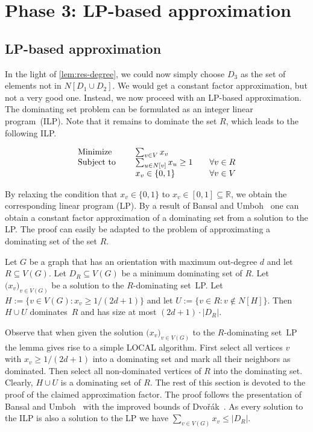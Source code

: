 
\section{Phase 3: LP-based approximation}\label{sec:LP}

\subsection{LP-based approximation}
In the light of \cref{lem:res-degree}, we could now simply choose
$D_3$ as the set of elements not in $N[D_1\cup D_2]$.  We would get a
constant factor approximation, but not a very good one. Instead,
we now proceed with an LP-based approximation. The dominating
set problem can be formulated as an integer linear program~(ILP).
Note that it remains to dominate the set $R$, which leads to the
following ILP.

\[
  \begin{array}{l l l}
    \text{Minimize }    & \sum_{v\in V}x_v &\\
    \text{Subject to }\quad & \sum_{u\in N[v]}x_u \ge 1 \quad &\forall v\in R \\
                            & x_v\in \{0,1\}                   &\forall v \in V\\
  \end{array}
\]

By relaxing the condition that $x_v\in \{0,1\}$ to $x_v\in [0,1]\subseteq \mathbb{R}$,
we obtain the corresponding linear program (LP). By a result of
Bansal and Umboh~\cite{bansal2017tight} one can obtain a constant
factor approximation of a dominating set from a solution to the LP.
The proof can easily be adapted to the problem of approximating a
dominating set of the set $R$.

\begin{lemma}
  Let $G$ be a graph that has an orientation with maximum out-degree $d$
  and let $R\subseteq V(G)$. Let $D_R\subseteq V(G)$ be a minimum dominating
  set of $R$.
  Let $\big(x_v\big)_{v\in V(G)}$ be a solution to the
  $R$-dominating set~LP. Let $H:=\{v\in V(G) : x_v\ge 1/(2d+1)\}$ and
  let $U:=\{v\in R : v\not\in N[H]\}$. Then $H\cup U$ dominates~$R$
  and has size at most $(2d+1)\cdot |D_R|$.
\end{lemma}

Observe that when given the solution $\big(x_v\big)_{v\in V(G)}$ to the
$R$-dominating set~LP the lemma gives rise to a simple LOCAL algorithm.
First select all vertices $v$ with $x_v\geq 1/(2d+1)$ into a dominating set
and mark all their neighbors as dominated. Then select all non-dominated
vertices of $R$ into the dominating set. Clearly, $H\cup U$ is a dominating
set of $R$. The rest of this section is devoted to the proof of the claimed
approximation factor. The proof follows the presentation of Bansal and
Umboh~\cite{bansal2017tight} with the improved bounds of Dvo\v{r}\'ak~\cite{dvovrak2019distance}. As every solution to the ILP is also a solution
to the LP we have $\sum_{v\in V(G)}x_v\leq |D_R|$.

